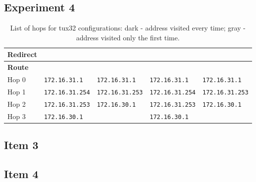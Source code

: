 \documentclass[a4paper, 11pt]{report}
\newcommand\greencheckmark{{\color{ForestGreen}\ding{52}}}
\newcommand\redcross{{\color{red}\ding{54}}}
\begin{document}
\begin{landscape}
\section{Experiment 4}

\begin{table}[h]
    \centering
    \small
    \begin{tabular}{@{}l | l | l | l | l@{}}
        {\normalfont\textbf{Redirect      }} & \redcross    & \redcross & \greencheckmark          & \greencheckmark \\ \hline
        {\normalfont\textbf{Route         }} & \redcross    & \greencheckmark & \redcross          & \greencheckmark \\ \hline
        Hop 0                                & \texttt{172.16.31.1  } & \texttt{172.16.31.1  }    & \texttt{172.16.31.1  }             & \texttt{172.16.31.1  }          \\
        Hop 1                                & \texttt{172.16.31.254} & \texttt{172.16.31.253}    & \texttt{\color{gray}172.16.31.254} & \texttt{172.16.31.253}          \\
        Hop 2                                & \texttt{172.16.31.253} & \texttt{172.16.30.1  }    & \texttt{172.16.31.253}             & \texttt{172.16.30.1  }          \\
        Hop 3                                & \texttt{172.16.30.1  } & \texttt{             }    & \texttt{172.16.30.1  }             & \texttt{             }          
    \end{tabular}
    \caption{List of hops for tux32 configurations: dark - address visited every time; gray - address visited only the first time.}
    \label{fig:hops}
\end{table}

\setcounter{subsection}{2}
\subsection{Item 3}


\setcounter{subsection}{3}
\subsection{Item 4}


\end{landscape}
\end{document}
